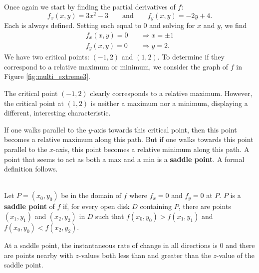 {Once again we start by finding the partial derivatives of $f$:
$$f_x(x,y) = 3x^2-3\qquad \text{and} \qquad f_y(x,y) = -2y+4.$$
Each is always defined. Setting each equal to 0 and solving for $x$ and $y$, we find
\begin{align*}
f_x(x,y) = 0 \quad &\Rightarrow x=\pm 1\\
f_y(x,y) = 0\quad &\Rightarrow y = 2.
\end{align*}
We have two critical points: $(-1,2)$ and $(1,2)$. To determine if they correspond to a relative maximum or minimum, we consider the graph of $f$ in Figure \ref{fig:multi_extreme3}.

The critical point $(-1,2)$ clearly corresponds to a relative maximum. However, the critical point at $(1,2)$ is neither a maximum nor a minimum, displaying a different, interesting characteristic. 

If one walks parallel to the $y$-axis towards this critical point, then this point becomes a relative maximum along this path. But if one walks towards this point parallel to the $x$-axis, this point becomes a relative minimum along this path. A point that seems to act as both a max and a min is a \textbf{saddle point}. A formal definition follows.
}\\

{Let $P=(x_0,y_0)$ be in the domain of $f$ where $f_x=0$ and $f_y=0$ at $P$. $P$ is a \textbf{saddle point} of $f$ if, for every open disk $D$ containing $P$, there are points $(x_1,y_1)$ and $(x_2,y_2)$ in $D$ such that $f(x_0,y_0)>f(x_1,y_1)$ and $f(x_0,y_0)<f(x_2,y_2)$.
}

At a saddle point, the instantaneous rate of change in all directions is 0 and there are points nearby with $z$-values both less than and greater than the $z$-value of the saddle point.

